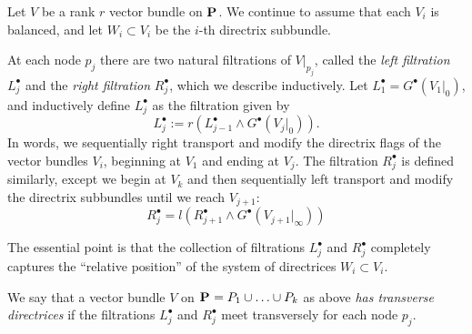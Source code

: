 \documentclass[11pt, two side, letterpaper, final]{amsart}
\renewcommand{\P}{{\bf P}}
\newcommand{\chain}[1]{\P_{#1}}
\begin{document}
Let $V$ be a rank $r$ vector bundle on $\chain{}$.  We continue to assume that each $V_{i}$ is balanced, and let $W_{i} \subset V_{i}$ be the $i$-th directrix subbundle.  

At each node $p_{j}$ there are two natural filtrations of $V|_{p_{j}}$, called the \emph{left filtration} $L^{\bullet}_{j}$ and the \emph{right filtration} $R^{\bullet}_{j}$, which we describe inductively.  Let $L^\bullet_1 =G^\bullet(V_1|_0)$,
and inductively define  $L^{\bullet}_{j}$ as the filtration given by 
\[
L^{\bullet}_{j} := r\left(L^\bullet_{j-1} \wedge G^\bullet(V_j|_0) \right) \text{.}
\] 
In words, we sequentially right transport and modify the directrix flags of the vector bundles $V_{i}$, beginning at $V_{1}$ and ending at $V_{j}$.  The filtration $R^{\bullet}_{j}$ is defined similarly, except we begin at $V_{k}$ and then sequentially left transport and modify the directrix subbundles until we reach $V_{j+1}$: 
\[
R^\bullet_j=l\left(R^\bullet_{j+1}\wedge G^\bullet(V_{j+1}|_\infty) \right)
\]

The essential point is that the collection of filtrations $L^{\bullet}_{j}$ and $R^{\bullet}_{j}$ completely captures the ``relative position'' of the system of directrices $W_{i} \subset V_{i}$.  

\begin{definition}
We say that a vector bundle $V$ on $\chain{} = P_{1} \cup \ldots \cup P_{k}$ as above \emph{has transverse directrices} if the filtrations $L^{\bullet}_{j}$ and $R^{\bullet}_{j}$ meet transversely for each node $p_{j}$. 
\end{definition}
\end{document}
